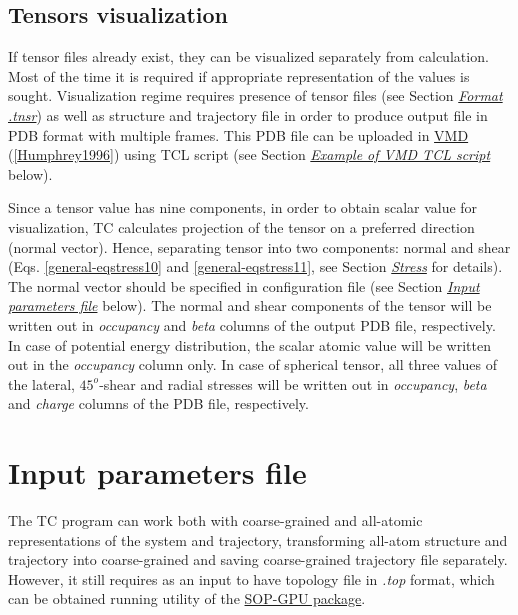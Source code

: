 \documentclass[letterpaper,10pt,english]{sphinxmanual}
\begin{document}
\section{Tensors visualization}
\label{general:tensors-visualization}
If tensor files already exist, they can be visualized separately from calculation. Most of the time it is required if appropriate representation of the values is sought. Visualization regime requires presence of tensor files (see Section {\hyperref[general:tnsrfile]{\emph{Format .tnsr}}}) as well as structure and trajectory file in order to produce output file in PDB format with multiple frames. This PDB file can be uploaded in \href{http://www.ks.uiuc.edu/Research/vmd/}{VMD} ({\hyperref[general:humphrey1996]{{[}Humphrey1996{]}}}) using TCL script (see Section {\hyperref[general:tclscrpt]{\emph{Example of VMD TCL script}}} below).

Since a tensor value has nine components, in order to obtain scalar value for visualization, TC calculates projection of the tensor on a preferred direction (normal vector). Hence, separating tensor into two components: normal and shear (Eqs. \eqref{general-eqstress10} and \eqref{general-eqstress11}, see Section {\hyperref[general:theorstress]{\emph{Stress}}} for details). The normal vector should be specified in configuration file (see Section {\hyperref[general:inputpar]{\emph{Input parameters file}}} below). The normal and shear components of the tensor will be written out in \emph{occupancy} and \emph{beta} columns of the output PDB file, respectively. In case of potential energy distribution, the scalar atomic value will be written out in the \emph{occupancy} column only. In case of spherical tensor, all three values of the lateral, $45^o$-shear and radial stresses will be written out in \emph{occupancy}, \emph{beta} and \emph{charge} columns of the PDB file, respectively.


\chapter{Input parameters file}
\label{general:input-parameters-file}\label{general:inputpar}
The TC program can work both with coarse-grained and all-atomic representations of the system and trajectory, transforming all-atom structure and trajectory into coarse-grained and saving coarse-grained trajectory file separately. However, it still requires as an input to have topology file in \emph{.top} format, which can be obtained running  utility of the \href{http://sop-gpu.readthedocs.org/}{SOP-GPU package}.
\end{document}
